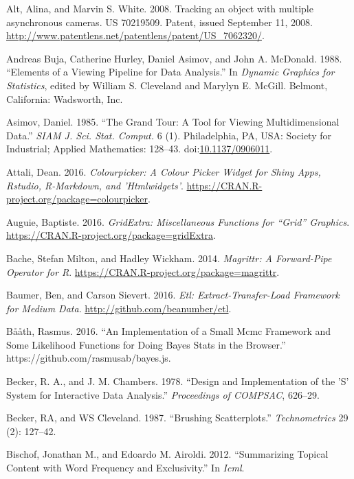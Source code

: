 \documentclass[12pt,]{isuthesis}
\begin{document}
\hypertarget{ref-patent}{}
Alt, Alina, and Marvin S. White. 2008. Tracking an object with multiple
asynchronous cameras. US 70219509. Patent, issued September 11, 2008.
\url{http://www.patentlens.net/patentlens/patent/US_7062320/}.

\hypertarget{ref-viewing-pipeline}{}
Andreas Buja, Catherine Hurley, Daniel Asimov, and John A. McDonald.
1988. ``Elements of a Viewing Pipeline for Data Analysis.'' In
\emph{Dynamic Graphics for Statistics}, edited by William S. Cleveland
and Marylyn E. McGill. Belmont, California: Wadsworth, Inc.

\hypertarget{ref-grand-tour}{}
Asimov, Daniel. 1985. ``The Grand Tour: A Tool for Viewing
Multidimensional Data.'' \emph{SIAM J. Sci. Stat. Comput.} 6 (1).
Philadelphia, PA, USA: Society for Industrial; Applied Mathematics:
128--43. doi:\href{https://doi.org/10.1137/0906011}{10.1137/0906011}.

\hypertarget{ref-colourpicker}{}
Attali, Dean. 2016. \emph{Colourpicker: A Colour Picker Widget for Shiny
Apps, Rstudio, R-Markdown, and 'Htmlwidgets'}.
\url{https://CRAN.R-project.org/package=colourpicker}.

\hypertarget{ref-gridExtra}{}
Auguie, Baptiste. 2016. \emph{GridExtra: Miscellaneous Functions for
``Grid'' Graphics}. \url{https://CRAN.R-project.org/package=gridExtra}.

\hypertarget{ref-magrittr}{}
Bache, Stefan Milton, and Hadley Wickham. 2014. \emph{Magrittr: A
Forward-Pipe Operator for R}.
\url{https://CRAN.R-project.org/package=magrittr}.

\hypertarget{ref-etl}{}
Baumer, Ben, and Carson Sievert. 2016. \emph{Etl: Extract-Transfer-Load
Framework for Medium Data}. \url{http://github.com/beanumber/etl}.

\hypertarget{ref-bayes-js}{}
Bååth, Rasmus. 2016. ``An Implementation of a Small Mcmc Framework and
Some Likelihood Functions for Doing Bayes Stats in the Browser.''
https://github.com/rasmusab/bayes.js.

\hypertarget{ref-S:1978}{}
Becker, R. A., and J. M. Chambers. 1978. ``Design and Implementation of
the 'S' System for Interactive Data Analysis.'' \emph{Proceedings of
COMPSAC}, 626--29.

\hypertarget{ref-brushing-scatterplots}{}
Becker, RA, and WS Cleveland. 1987. ``Brushing Scatterplots.''
\emph{Technometrics} 29 (2): 127--42.

\hypertarget{ref-Bischof}{}
Bischof, Jonathan M., and Edoardo M. Airoldi. 2012. ``Summarizing
Topical Content with Word Frequency and Exclusivity.'' In \emph{Icml}.
\end{document}

